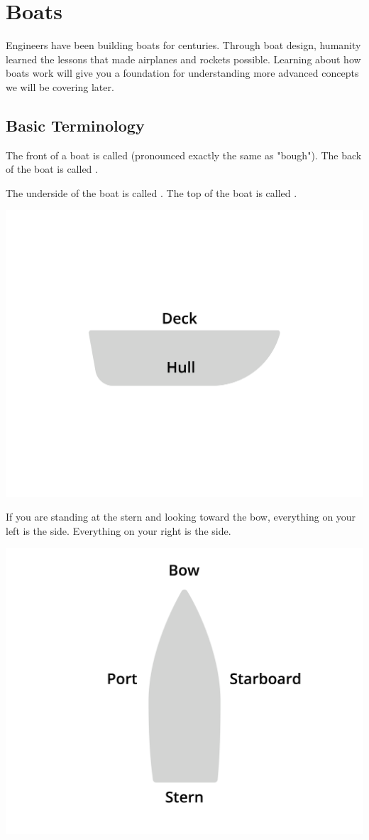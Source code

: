\chapter{Boats}

Engineers have been building boats for centuries.  Through boat design, humanity learned the lessons that made airplanes and rockets possible.  
Learning about how boats work will give you a foundation for understanding more advanced concepts we will be covering later.

\section{Basic Terminology}

The front of a boat is called  (pronounced exactly the same as "bough"). The back of the boat is called .

The underside of the boat is called .  The top of the boat is called .

\includegraphics[width=.75\textwidth]{deckHull.png}


If you are standing at the stern and looking toward the bow, everything on your left is the  side.  Everything on your right is the  side.

\includegraphics[width=.75\textwidth]{bowStern.png}

